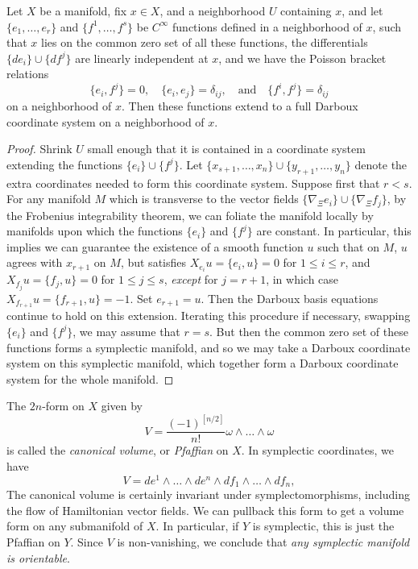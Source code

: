 \begin{theorem}
    Let $X$ be a manifold, fix $x \in X$, and a neighborhood $U$ containing $x$, and let $\{ e_1,\dots,e_r \}$ and $\{ f^1,\dots,f^s \}$ be $C^\infty$ functions defined in a neighborhood of $x$, such that $x$ lies on the common zero set of all these functions, the differentials $\{ de_i \} \cup \{ df^j \}$ are linearly independent at $x$, and we have the Poisson bracket relations
    \[ \{ e_i, f^j \} = 0, \quad \{ e_i, e_j \} = \delta_{ij}, \quad\text{and}\quad \{ f^i, f^j \} = \delta_{ij} \]
    on a neighborhood of $x$. Then these functions extend to a full Darboux coordinate system on a neighborhood of $x$.
\end{theorem}
\begin{proof}
    Shrink $U$ small enough that it is contained in a coordinate system extending the functions $\{ e_i \} \cup \{ f^j \}$. Let $\{ x_{s+1}, \dots, x_n \} \cup \{ y_{r+1}, \dots, y_n \}$ denote the extra coordinates needed to form this coordinate system. Suppose first that $r < s$. For any manifold $M$ which is transverse to the vector fields $\{ \nabla_\Xi e_i \} \cup \{ \nabla_\Xi f_j \}$, by the Frobenius integrability theorem, we can foliate the manifold locally by manifolds upon which the functions $\{ e_i \}$ and $\{ f^j \}$ are constant. In particular, this implies we can guarantee the existence of a smooth function $u$ such that on $M$, $u$ agrees with $x_{r+1}$ on $M$, but satisfies $X_{e_i} u = \{ e_i, u \} = 0$ for $1 \leq i \leq r$, and $X_{f_j} u = \{ f_j, u \} = 0$ for $1 \leq j \leq s$, \emph{except} for $j = r+1$, in which case $X_{f_{r+1}} u = \{ f_{r+1}, u \} = -1$. Set $e_{r+1} = u$. Then the Darboux basis equations continue to hold on this extension. Iterating this procedure if necessary, swapping $\{ e_i \}$ and $\{ f^j \}$, we may assume that $r = s$. But then the common zero set of these functions forms a symplectic manifold, and so we may take a Darboux coordinate system on this symplectic manifold, which together form a Darboux coordinate system for the whole manifold.
\end{proof}

The $2n$-form on $X$ given by
%
\[ V = \frac{(-1)^{[n/2]}}{n!} \omega \wedge \dots \wedge \omega \]
%
is called the \emph{canonical volume}, or \emph{Pfaffian} on $X$. In symplectic coordinates, we have
%
\[ V = de^1 \wedge \dots \wedge de^n \wedge df_1 \wedge \dots \wedge df_n, \]
%
The canonical volume is certainly invariant under symplectomorphisms, including the flow of Hamiltonian vector fields. We can pullback this form to get a volume form on any submanifold of $X$. In particular, if $Y$ is symplectic, this is just the Pfaffian on $Y$. Since $V$ is non-vanishing, we conclude that \emph{any symplectic manifold is orientable}.

